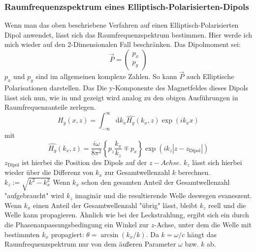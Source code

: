 \documentclass{article}
\begin{document}
	\subsubsection{Raumfrequenzspektrum eines Elliptisch-Polarisierten-Dipols}
		Wenn man das oben beschriebene Verfahren auf einen Elliptisch-Polarisierten Dipol anwendet, lässt sich das Raumfrequenzspektrum bestimmen. Hier werde ich mich wieder auf den 2-Dimensionalen Fall beschränken. Das Dipolmoment sei: $$\vec{P}= \begin{pmatrix} p_x \\ p_y \end{pmatrix}$$
		$p_x$ und $p_y$ sind im allgemeinen komplexe Zahlen. So kann $\vec{P}$ auch Elliptische Polarisationen darstellen. Das Die y-Komponente des Magnetfeldes dieses Dipols lässt sich nun, wie in \cite{Novotny.2012b} und \cite{RodriguezFortuno.2013} gezeigt wird analog zu den obigen Ausführungen in Raumfrequenzanteile zerlegen.
		\begin{equation}
			H_y(x, z) = \int_{-\infty}^{\infty}\mathrm{d}k_x\hat{H_y}(k_x, z)\exp(ik _xx)
		\end{equation}
		mit
		\begin{equation}
			\boxed{\hat{H_y}(k_x, z) = \dfrac{i\omega}{8\pi^2}\left\{p_z\dfrac{k_x}{k_z} \mp p_x\right\}\exp(ik_z|z-z_{\mathrm{Dipol}}|)}
		\end{equation}
	$z_{\mathrm{Dipol}}$ ist hierbei die Position des Dipols auf der $z-Achse$. $k_z$ lässt sich hierbei wieder über die Differenz von $k_x$ zur Gesamtwellenzahl $k$ berechnen. $k_z := \sqrt{k^2-k_x^2}$ Wenn $k_x$ schon den gesamten Anteil der Gesamtwellenzahl "aufgebraucht" wird $k_z$ imaginär und die resultierende Welle deswegen evaneszent. Wenn $k_x$ einen Anteil der Gesamtwellenzahl "übrig" lässt, bleibt $k_z$ reell und die Welle kann propagieren. Ähnlich wie bei der Leckstrahlung, ergibt sich ein durch die Phasenanpassungsbedingung ein Winkel zur $z$-Achse, unter dem die Welle mit bestimmten $k_x$ propagiert: $\theta = \arcsin(k_x/k)$. Da $k = \omega / c$  hängt das Raumfrequenzspektrum nur von dem äußeren Parameter $\omega$ bzw. $k$ ab. 
\end{document}
